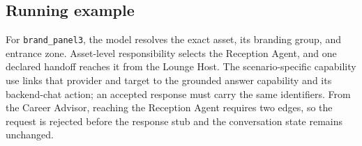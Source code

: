\subsection{Running example}

For \texttt{brand\_panel3}, the model resolves the exact asset, its branding
group, and entrance zone.  Asset-level responsibility selects the Reception
Agent, and one declared handoff reaches it from the Lounge Host.  The
scenario-specific capability use links that provider and target to the grounded
answer capability and its backend-chat action; an accepted response must carry
the same identifiers.  From the Career Advisor, reaching the Reception Agent
requires two edges, so the request is rejected before the response stub and the
conversation state remains unchanged.
